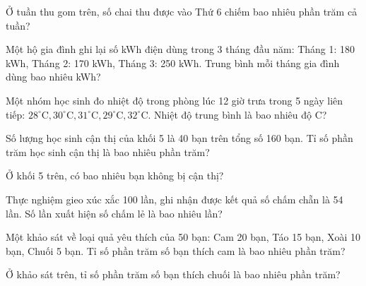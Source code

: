 \begin{ex}
  Ở tuần thu gom trên, số chai thu được vào Thứ 6 chiếm bao nhiêu phần trăm cả tuần?
\end{ex}

\begin{ex}
  Một hộ gia đình ghi lại số kWh điện dùng trong 3 tháng đầu năm: Tháng 1: 180 kWh, Tháng 2: 170 kWh, Tháng 3: 250 kWh. Trung bình mỗi tháng gia đình dùng bao nhiêu kWh?
\end{ex}

\begin{ex}
  Một nhóm học sinh đo nhiệt độ trong phòng lúc 12 giờ trưa trong 5 ngày liên tiếp: $28^\circ\text{C}, 30^\circ\text{C}, 31^\circ\text{C}, 29^\circ\text{C}, 32^\circ\text{C}$. Nhiệt độ trung bình là bao nhiêu độ C?
\end{ex}

\begin{ex}
  Số lượng học sinh cận thị của khối 5 là 40 bạn trên tổng số 160 bạn. Tỉ số phần trăm học sinh cận thị là bao nhiêu phần trăm?
\end{ex}

\begin{ex}
  Ở khối 5 trên, có bao nhiêu bạn không bị cận thị?
\end{ex}

\begin{ex}
  Thực nghiệm gieo xúc xắc 100 lần, ghi nhận được kết quả số chấm chẵn là 54 lần. Số lần xuất hiện số chấm lẻ là bao nhiêu lần?
\end{ex}

\begin{ex}
  Một khảo sát về loại quả yêu thích của 50 bạn: Cam 20 bạn, Táo 15 bạn, Xoài 10 bạn, Chuối 5 bạn. Tỉ số phần trăm số bạn thích cam là bao nhiêu phần trăm?
\end{ex}

\begin{ex}
  Ở khảo sát trên, tỉ số phần trăm số bạn thích chuối là bao nhiêu phần trăm?
\end{ex}

